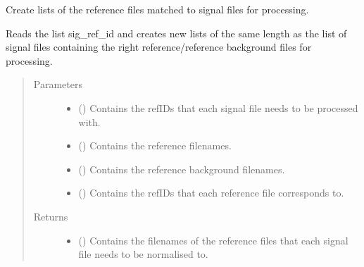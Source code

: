 \documentclass[a4paper,10pt,english]{sphinxmanual}
\begin{document}
\begin{fulllineitems}

\begin{fulllineitems}
\label{\detokenize{sfgtools:sfgtools.SFGProcessTools.create_matched_ref_list}}
\sphinxAtStartPar
Create lists of the reference files matched to signal files for processing.

\sphinxAtStartPar
Reads the list sig\_ref\_id and creates new lists of the same length as the list of signal files
containing the right reference/reference background files for processing.
\begin{quote}\begin{description}
\item[{Parameters}] \leavevmode\begin{itemize}
\item {} 
\sphinxAtStartPar
{} () \textendash{} Contains the refIDs that each signal file needs to be processed with.

\item {} 
\sphinxAtStartPar
{} () \textendash{} Contains the reference filenames.

\item {} 
\sphinxAtStartPar
{} () \textendash{} Contains the reference background filenames.

\item {} 
\sphinxAtStartPar
{} () \textendash{} Contains the refIDs that each reference file corresponds to.

\end{itemize}

\item[{Returns}] \leavevmode
\sphinxAtStartPar
\begin{itemize}
\item {} 
\sphinxAtStartPar
{} () \textendash{} Contains the filenames of the reference files that each signal file needs to be normalised to.


\end{itemize}
\end{description}
\end{quote}
\end{fulllineitems}
\end{fulllineitems}
\end{document}
